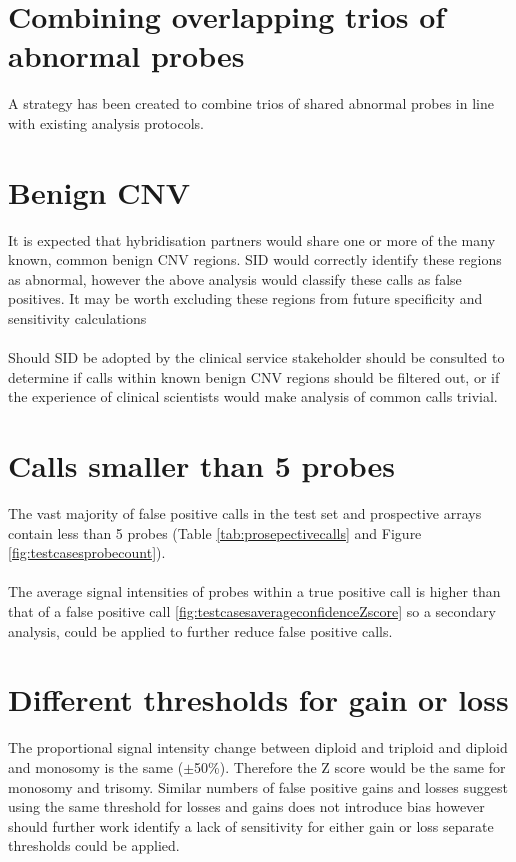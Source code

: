 \section{Combining overlapping trios of abnormal probes}
A strategy has been created to combine trios of shared abnormal probes in line with existing analysis protocols.

\section{Benign CNV}
It is expected that hybridisation partners would share one or more of the many known, common benign CNV regions. SID would correctly identify these regions as abnormal, however the above analysis would classify these calls as false positives. It may be worth excluding these regions from future specificity and sensitivity calculations
\paragraph*{}
Should SID be adopted by the clinical service stakeholder should be consulted to determine if calls within known benign CNV regions should be filtered out, or  if the experience of clinical scientists would make analysis of common calls trivial.


\section{Calls smaller than 5 probes}
The vast majority of false positive calls in the test set and prospective arrays contain less than 5 probes (Table \ref{tab:prosepectivecalls} and Figure \ref{fig:testcasesprobecount}). 
\paragraph*{}
The average signal intensities of probes within a true positive call is higher than that of a false positive call \ref{fig:testcasesaverageconfidenceZscore} so a secondary analysis, could be applied to further reduce false positive calls. 


\section{Different thresholds for gain or loss}
The proportional signal intensity change between diploid and triploid and diploid and monosomy is the same ($\pm$50\%). Therefore the Z score would be the same for monosomy and trisomy. 
Similar numbers of false positive gains and losses suggest using the same threshold for losses and gains does not introduce bias however should further work identify a lack of sensitivity for either gain or loss separate thresholds could be applied.

